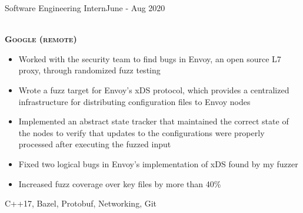 %
%
%

\begin{projects}

    \work
	{Software Engineering Intern}{June - Aug 2020}
	{
		\\ \textbf{\textsc{Google (remote)}}
	    \begin{itemize}
			\item Worked with the security team to find bugs in Envoy, an open source L7 proxy, through randomized fuzz testing
			\item Wrote a fuzz target for Envoy's xDS protocol, which provides a centralized infrastructure for distributing configuration files to Envoy nodes
			\item Implemented an abstract state tracker that maintained the correct state of the nodes to verify that updates to the configurations were properly processed after executing the fuzzed input
			\item Fixed two logical bugs in Envoy's implementation of xDS found by my fuzzer
			\item Increased fuzz coverage over key files by more than 40\%
        \end{itemize}
    }
	{C++17, Bazel, Protobuf, Networking, Git} \\

\end{projects}
